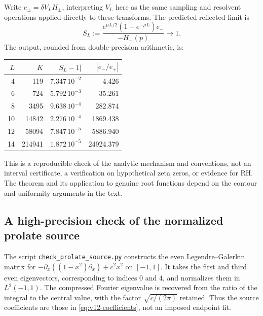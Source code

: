 \documentclass[11pt]{article}
\theoremstyle{remark}
\begin{document}
Write $e_\pm=\delta V_LH_\pm$, interpreting $V_L$ here as the same
sampling and resolvent operations applied directly to these transforms.
The predicted reflected limit is
\[
 S_L:=\frac{e^{\overline\mu L/2}(1-e^{-\overline\mu L})e_-}
                  {-H_-(p)}\longrightarrow1.
\]
The output, rounded from double-precision arithmetic, is:
\begin{center}
\begin{tabular}{rrrr}
\toprule
$L$ & $K$ & $|S_L-1|$ & $|e_-/e_+|$\\
\midrule
4  & 119    & $7.347\,10^{-2}$ & 4.426\\
6  & 724    & $5.792\,10^{-3}$ & 35.261\\
8  & 3495   & $9.638\,10^{-4}$ & 282.874\\
10 & 14842  & $2.276\,10^{-4}$ & 1869.438\\
12 & 58094  & $7.847\,10^{-5}$ & 5886.940\\
14 & 214941 & $1.872\,10^{-5}$ & 24924.379\\
\bottomrule
\end{tabular}
\end{center}
This is a reproducible check of the analytic mechanism and conventions,
not an interval certificate, a verification on hypothetical zeta zeros,
or evidence for RH. The theorem and its application to genuine root
functions depend on the contour and uniformity arguments in the text.
\subsection*{A high-precision check of the normalized prolate source}
The script \texttt{check\_prolate\_source.py} constructs the even
Legendre--Galerkin matrix for
$-\partial_x((1-x^2)\partial_x)+c^2x^2$ on $[-1,1]$.
It takes the first and third even eigenvectors, corresponding to indices
$0$ and $4$, and normalizes them in $L^2(-1,1)$. The compressed Fourier
eigenvalue is recovered from the ratio of the integral to the central
value, with the factor $\sqrt{c/(2\pi)}$ retained. Thus the source
coefficients are those in \eqref{eq:v12-coefficients}, not an imposed
endpoint fit.
\end{document}
